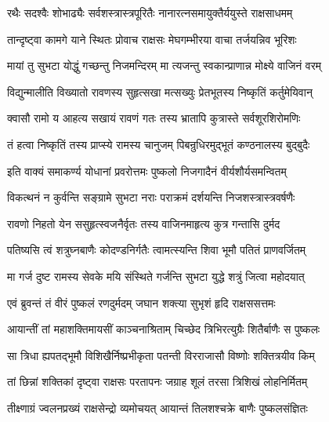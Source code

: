 

\twolineshloka
{रथैः सदश्वैः शोभाढ्यैः सर्वशस्त्रास्त्रपूरितैः}
{नानारत्नसमायुक्तैर्ययुस्ते राक्षसाधमम्}%

\twolineshloka
{तान्दृष्ट्वा कामगे याने स्थितः प्रोवाच राक्षसः}
{मेघगम्भीरया वाचा तर्जयन्निव भूरिशः}%

\twolineshloka
{मायां तु सुभटा योद्धुं गच्छन्तु निजमन्दिरम्}
{मा त्यजन्तु स्वकान्प्राणान्न मोक्ष्ये वाजिनं वरम्}%

\twolineshloka
{विद्युन्मालीति विख्यातो रावणस्य सुहृत्सखा}
{मत्सख्युः प्रेतभूतस्य निष्कृतिं कर्तुमेयिवान्}%

\twolineshloka
{क्वासौ रामो य आहत्य सखायं रावणं गतः}
{तस्य भ्रातापि कुत्रास्ते सर्वशूरशिरोमणिः}%

\twolineshloka
{तं हत्वा निष्कृतिं तस्य प्राप्स्ये रामस्य चानुजम्}
{पिबन्रुधिरमुद्भूतं कण्ठनालस्य बुद्बुदैः}%

\twolineshloka
{इति वाक्यं समाकर्ण्य योधानां प्रवरोत्तमः}
{पुष्कलो निजगादैनं वीर्यशौर्यसमन्वितम्}%


\twolineshloka
{विकत्थनं न कुर्वन्ति सङ्ग्रामे सुभटा नराः}
{पराक्रमं दर्शयन्ति निजशस्त्रास्त्रवर्षणैः}%

\twolineshloka
{रावणो निहतो येन ससुहृत्स्वजनैर्वृतः}
{तस्य वाजिनमाहृत्य कुत्र गन्तासि दुर्मद}%

\twolineshloka
{पतिष्यसि त्वं शत्रुघ्नबाणैः कोदण्डनिर्गतैः}
{त्वामत्स्यन्ति शिवा भूमौ पतितं प्राणवर्जितम्}%

\twolineshloka
{मा गर्ज दुष्ट रामस्य सेवके मयि संस्थिते}
{गर्जन्ति सुभटा युद्धे शत्रुं जित्वा महोदयात्}%


\twolineshloka
{एवं ब्रुवन्तं तं वीरं पुष्कलं रणदुर्मदम्}
{जघान शक्त्या सुभृशं हृदि राक्षससत्तमः}%

\twolineshloka
{आयान्तीं तां महाशक्तिमायसीं काञ्चनाश्रिताम्}
{चिच्छेद त्रिभिरत्युग्रैः शितैर्बाणैः स पुष्कलः}%

\twolineshloka
{सा त्रिधा ह्यपतद्भूमौ विशिखैर्निष्प्रभीकृता}
{पतन्ती विरराजासौ विष्णोः शक्तित्रयीव किम्}%

\twolineshloka
{तां छिन्नां शक्तिकां दृष्ट्वा राक्षसः परतापनः}
{जग्राह शूलं तरसा त्रिशिखं लोहनिर्मितम्}%

\twolineshloka
{तीक्ष्णाग्रं ज्वलनप्रख्यं राक्षसेन्द्रो व्यमोचयत्}
{आयान्तं तिलशश्चक्रे बाणैः पुष्कलसंज्ञितः}%

